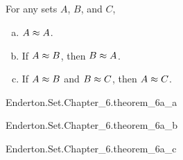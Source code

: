 \documentclass{report}
\begin{document}
\subsection{}%

  \begin{theorem}[6A]
    For any sets $A$, $B$, and $C$,
      \begin{enumerate}[(a)]
        \item $A \approx A$.
        \item If $A \approx B$, then $B \approx A$.
        \item If $A \approx B$ and $B \approx C$, then
          $A \approx C$.
      \end{enumerate}
  \end{theorem}

    {Enderton.Set.Chapter\_6.theorem\_6a\_a}

    {Enderton.Set.Chapter\_6.theorem\_6a\_b}

    {Enderton.Set.Chapter\_6.theorem\_6a\_c}
\end{document}
